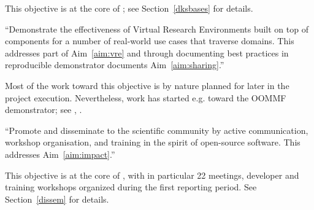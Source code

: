 \begin{compactenum}
  This objective is at the core of ; see
  Section~\ref{dksbases} for details. 


\item \label{objective:demo} ``Demonstrate the effectiveness of Virtual
  Research Environments built on top of \ODK components for a
  number of real-world use cases that traverse domains. This addresses
  part of Aim~\ref{aim:vre} and through documenting best practices in
  reproducible demonstrator documents Aim~\ref{aim:sharing}.''

  Most of the work toward this objective is by nature planned for
  later in the project execution. Nevertheless, work has started e.g.
  toward the OOMMF demonstrator; see
  ,
  .

\item \label{objective:disseminate} ``Promote and disseminate
  \ODK to the scientific community by active communication,
  workshop organisation, and training in the spirit of open-source
  software. This addresses Aim~\ref{aim:impact}.''

  This objective is at the core of , with in particular
  22 meetings, developer and training workshops organized during the
  first reporting period. See Section~\ref{dissem} for details.
\end{compactenum}


